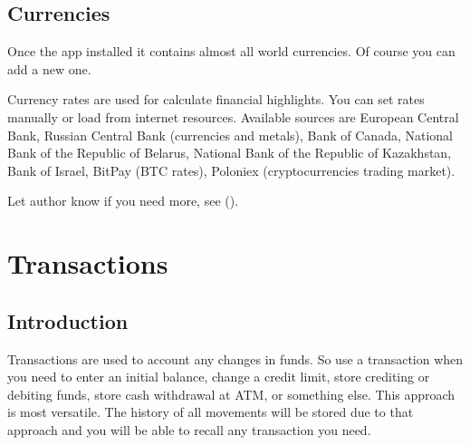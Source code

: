 \documentclass[a4paper,10pt,english]{sphinxmanual}
\begin{document}
\noindent{}

\noindent{}


\section{Currencies}
\label{\detokenize{directories:currencies}}
\sphinxAtStartPar
Once the app installed it contains almost all world currencies. Of course you can add a new one.

\sphinxAtStartPar
Currency rates are used for calculate financial highlights. You can set rates manually
or load from internet resources. Available sources are European Central Bank,
Russian Central Bank (currencies and metals), Bank of Canada, National Bank of the Republic of Belarus,
National Bank of the Republic of Kazakhstan, Bank of Israel, BitPay (BTC rates), Poloniex (cryptocurrencies trading market).

\sphinxAtStartPar
Let author know if you need more, see {\hyperref[\detokenize{preface:section-feedback}]{}} ().

\sphinxstepscope


\chapter{Transactions}
\label{\detokenize{transactions:transactions}}\label{\detokenize{transactions:chapter-transactions}}\label{\detokenize{transactions::doc}}

\section{Introduction}
\label{\detokenize{transactions:introduction}}
\sphinxAtStartPar
Transactions are used to account any changes in funds. So use a transaction when you need to
enter an initial balance, change a credit limit, store crediting or debiting funds,
store cash withdrawal at ATM, or something else. This approach is most versatile. The history of
all movements will be stored due to that approach and you will be able to recall any transaction
you need.

\noindent{}

\noindent{}
\end{document}
